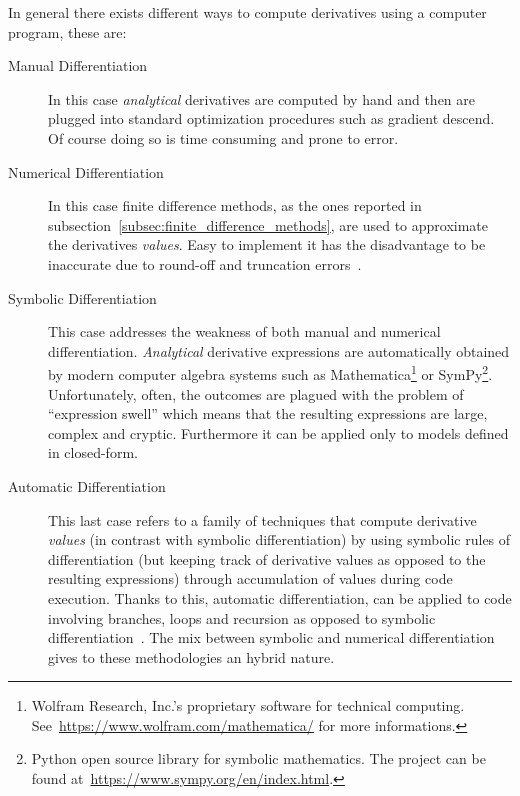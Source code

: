 In general there exists different ways to compute derivatives using a computer program, these are:
\begin{description}
	\item[Manual Differentiation] In this case \emph{analytical} derivatives are computed by hand and then are plugged into standard optimization procedures such as gradient descend. Of course doing so is time consuming and prone to error.
	
	\item[Numerical Differentiation] In this case finite difference methods, as the ones reported in subsection~\ref{subsec:finite_difference_methods}, are used to approximate the derivatives \emph{values}. Easy to implement it has the disadvantage to be inaccurate due to round-off and truncation errors~\cite{LeVeque:FD_book}.

	\item[Symbolic Differentiation] This case addresses the weakness of both manual and numerical differentiation. \emph{Analytical} derivative expressions are automatically obtained by modern computer algebra systems such as Mathematica\footnote{Wolfram Research, Inc.'s proprietary software for technical computing. See~\url{https://www.wolfram.com/mathematica/} for more informations.} or SymPy\footnote{Python open source library for symbolic mathematics. The project can be found at~\url{https://www.sympy.org/en/index.html}.}. Unfortunately, often, the outcomes are plagued with the problem of ``expression swell'' which means that the resulting expressions are large, complex and cryptic. Furthermore it can be applied only to models defined in closed-form.
	
	\item[Automatic Differentiation] This last case refers to a family of techniques that compute derivative \emph{values} (in contrast with symbolic differentiation) by using symbolic rules of differentiation (but keeping track of derivative values as opposed to the resulting expressions) through accumulation of values during code execution. Thanks to this, automatic differentiation, can be applied to code involving branches, loops and recursion as opposed to symbolic differentiation~\cite{Baydin:AD_survey}. The mix between symbolic and numerical differentiation gives to these methodologies an hybrid nature.
\end{description}

